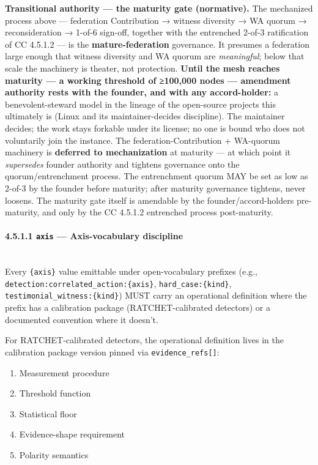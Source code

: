 \documentclass[11pt]{article}
\begin{document}
\textbf{Transitional authority — the maturity gate (normative).} The mechanized process above — federation Contribution → witness diversity → WA quorum → reconsideration → 1-of-6 sign-off, together with the entrenched 2-of-3 ratification of CC 4.5.1.2 — is the \textbf{mature-federation} governance. It presumes a federation large enough that witness diversity and WA quorum are \textit{meaningful}; below that scale the machinery is theater, not protection. \textbf{Until the mesh reaches maturity — a working threshold of ≥100,000 nodes — amendment authority rests with the founder, and with any accord-holder:} a benevolent-steward model in the lineage of the open-source projects this ultimately is (Linux and its maintainer-decides discipline). The maintainer decides; the work stays forkable under its license; no one is bound who does not voluntarily join the instance. The federation-Contribution + WA-quorum machinery is \textbf{deferred to mechanization} at maturity — at which point it \textit{supersedes} founder authority and tightens governance onto the quorum/entrenchment process. The entrenchment quorum MAY be set as low as 2-of-3 by the founder before maturity; after maturity governance tightens, never loosens. The maturity gate itself is amendable by the founder/accord-holders pre-maturity, and only by the CC 4.5.1.2 entrenched process post-maturity.


\paragraph{4.5.1.1 \texttt{axis} — Axis-vocabulary discipline}\mbox{}\\


Every \texttt{\{axis\}} value emittable under open-vocabulary prefixes (e.g., \texttt{detection:correlated\_action:\{axis\}}, \texttt{hard\_case:\{kind\}}, \texttt{testimonial\_witness:\{kind\}}) MUST carry an operational definition where the prefix has a calibration package (RATCHET-calibrated detectors) or a documented convention where it doesn't.


For RATCHET-calibrated detectors, the operational definition lives in the calibration package version pinned via \texttt{evidence\_refs[]}:


\begin{enumerate}\setlength\itemsep{0pt}
\item Measurement procedure
\item Threshold function
\item Statistical floor
\item Evidence-shape requirement
\item Polarity semantics
\end{enumerate}
\end{document}
